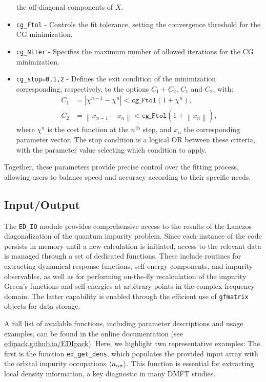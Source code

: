 \documentclass[edipack_sp.tex]{subfiles}
\begin{document}
\begin{itemize}
the off-diagonal components of $X$.
\item \texttt{cg\_Ftol} - Controls the fit tolerance, setting the 
convergence threshold for the CG minimization.
\item \texttt{cg\_Niter} - Specifies the maximum number of allowed 
iterations for the CG minimization.
\item \texttt{cg\_stop=0,1,2} - Defines the exit condition of the 
minimization corresponding, respectively, to the options  $C_1+C_2$, $C_1$ and $C_2$, with:
\begin{align*}
C_1 & = |\chi^{n-1} - \chi^n| < \mathtt{cg\_Ftol} (1+\chi^n), \\
C_2 & = \left\|x_{n-1} - x_n\right\| < 
\mathtt{cg\_Ftol} (1+\left\|x_n\right\|),
\end{align*}
where $\chi^n$ is the cost function at the $n^\mathrm{th}$ step, and 
$x_n$ the corresponding parameter vector. The stop condition is a 
logical OR between these criteria, with the parameter value selecting 
which condition to apply.
\end{itemize}

Together, these parameters provide precise control over the fitting 
process, allowing users to balance speed and accuracy according to 
their specific needs.



\subsection{Input/Output}\label{sSecIO}
The \texttt{ED\_IO} module provides comprehensive access to the 
results of the Lanczos diagonalization of the quantum impurity 
problem. Since each instance of the code persists in memory until a 
new calculation is initiated, access to the relevant data is managed 
through a set of dedicated functions. These include routines for 
extracting dynamical response functions, self-energy components, and 
impurity observables, as well as for performing on-the-fly 
recalculation of the impurity Green's functions and self-energies at 
arbitrary points in the complex frequency domain. The latter 
capability is enabled through the efficient use of \texttt{gfmatrix} 
objects for data storage.

A full list of available functions, including parameter descriptions 
and usage examples, can be found in the online documentation (see \href{https://edipack.github.io/EDIpack/}{edipack.github.io/EDIpack}).  
Here, we highlight two representative examples:
The first is the function \texttt{ed\_get\_dens}, which populates the 
provided input array with the orbital impurity occupations 
$\langle n_{\alpha\sigma}\rangle$. This function is essential for extracting 
local density information, a key diagnostic in many DMFT studies.
\end{document}
